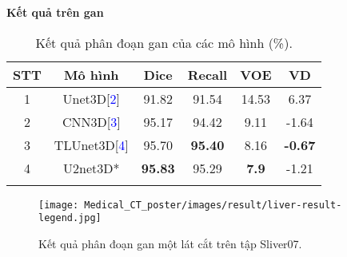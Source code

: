 \documentclass[portrait,a1paper,fontscale=0.42]{baposter}
\begin{document}
\begin{poster}
{\begin{figure}[H]
	\end{figure}
    \vspace{-3mm}
    \textbf{\color{blue} Kết quả trên gan}
    \vspace{-2mm}
    \begin{table}[H]
    \centering
    \begin{tabular}{c c c c c c}
    \Xhline{3\arrayrulewidth}
    {\textbf{STT}} & {\textbf{Mô hình}} & \textbf{Dice} & \textbf{Recall} & \textbf{VOE} & \textbf{VD}\\ \hline
    1 & Unet3D\small[\textcolor{blue}{2}]   & 91.82   & 91.54     & 14.53  & 6.37  \\
    2 & CNN3D\small[\textcolor{blue}{3}]    & 95.17   & 94.42     & 9.11   & -1.64  \\
    3 & TLUnet3D\small[\textcolor{blue}{4}]        & 95.70   & \textbf{95.40}     & 8.16   & \textbf{-0.67}    \\
    4 & U2net3D* & \textbf{95.83}  & 95.29 & \textbf{7.9}  & -1.21 \\ 
    \Xhline{3\arrayrulewidth}
    \end{tabular}
    \vspace{-2mm}
    \caption*{Kết quả phân đoạn gan của các mô hình (\%).}
    \end{table}
    \vspace{-6mm}
    \begin{figure}[H]
        \centering
        \texttt{[image: Medical\_CT\_poster/images/result/liver-result-legend.jpg]}
        \vspace{-3mm}
        \caption*{Kết quả phân đoạn gan một lát cắt trên tập Sliver07.}
    \end{figure}
        
}



\end{poster}
\end{document}
